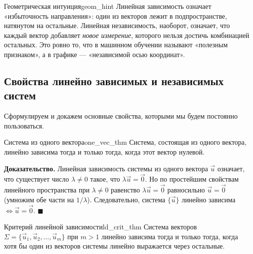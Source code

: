 \documentclass[12pt,a4paper]{article}
\newenvironment{myproof}{\noindent\textbf{Доказательство.}}{\hfill$\blacksquare$}
\begin{document}
\begin{remarkIT}{Геометрическая интуиция}{geom_hint}
  Линейная зависимость означает «избыточность направления»: один из
  векторов лежит в подпространстве, натянутом на остальные. Линейная
  независимость, наоборот, означает, что каждый вектор добавляет
  \emph{новое измерение}, которого нельзя достичь комбинацией остальных.
  Это ровно то, что в машинном обучении называют «полезным признаком», а
  в графике — «независимой осью координат».
\end{remarkIT}

\subsection*{Свойства линейно зависимых и независимых систем}

Сформулируем и докажем основные свойства, которыми мы будем постоянно
пользоваться.

\begin{theorem}{Система из одного вектора}{one_vec_thm}
  Система, состоящая из одного вектора, линейно зависима тогда и только
  тогда, когда этот вектор нулевой.
\end{theorem}

\begin{myproof}
  Линейная зависимость системы из одного вектора $\vec{u}$ означает, что
  существует число $\lambda \neq 0$ такое, что $\lambda\vec{u} = \vec{0}$.
  Но по простейшим свойствам линейного пространства при $\lambda \neq 0$
  равенство $\lambda\vec{u} = \vec{0}$ равносильно $\vec{u} = \vec{0}$
  (умножим обе части на $1/\lambda$). Следовательно, система $\{\vec{u}\}$
  линейно зависима $\iff \vec{u} = \vec{0}$.
\end{myproof}

\begin{theorem}{Критерий линейной зависимости}{ld_crit_thm}
  Система векторов $\Sigma = \{\vec{u}_1, \vec{u}_2, \dots, \vec{u}_m\}$
  при $m > 1$ линейно зависима тогда и только тогда, когда хотя бы один
  из векторов системы линейно выражается через остальные.
\end{theorem}
\end{document}
